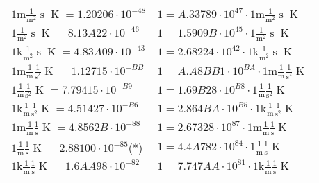 \begin{center}
\begin{longtable}{l l}
{\color{gray}$1 \bm{\mathrm{ m}}\frac1{\operatorname{m}^2}{\operatorname{s}}{}{\operatorname{K}} = 1.20206\cdot10^{-48} $}   & {\color{gray}$ 1 = A.33789\cdot10^{47} \cdot 1 \bm{\mathrm{ m}}\frac1{\operatorname{m}^2}{\operatorname{s}}{}{\operatorname{K}}$}  \\
{\color{black}$1 \bm{\mathrm{ }}\frac1{\operatorname{m}^2}{\operatorname{s}}{}{\operatorname{K}} = 8.13A22\cdot10^{-46} $}   & {\color{black}$ 1 = 1.5909B\cdot10^{45} \cdot 1 \bm{\mathrm{ }}\frac1{\operatorname{m}^2}{\operatorname{s}}{}{\operatorname{K}}$}  \\
{\color{gray}$1 \bm{\mathrm{ k}}\frac1{\operatorname{m}^2}{\operatorname{s}}{}{\operatorname{K}} = 4.83A09\cdot10^{-43} $}   & {\color{gray}$ 1 = 2.68224\cdot10^{42} \cdot 1 \bm{\mathrm{ k}}\frac1{\operatorname{m}^2}{\operatorname{s}}{}{\operatorname{K}}$}  \\
{\color{gray}$1 \bm{\mathrm{ m}}\frac1{\operatorname{m}}\frac1{\operatorname{s}^2}{}{\operatorname{K}} = 1.12715\cdot10^{-BB} $}   & {\color{gray}$ 1 = A.A8BB1\cdot10^{BA} \cdot 1 \bm{\mathrm{ m}}\frac1{\operatorname{m}}\frac1{\operatorname{s}^2}{}{\operatorname{K}}$}  \\
{\color{black}$1 \bm{\mathrm{ }}\frac1{\operatorname{m}}\frac1{\operatorname{s}^2}{}{\operatorname{K}} = 7.79415\cdot10^{-B9} $}   & {\color{black}$ 1 = 1.69B28\cdot10^{B8} \cdot 1 \bm{\mathrm{ }}\frac1{\operatorname{m}}\frac1{\operatorname{s}^2}{}{\operatorname{K}}$}  \\
{\color{gray}$1 \bm{\mathrm{ k}}\frac1{\operatorname{m}}\frac1{\operatorname{s}^2}{}{\operatorname{K}} = 4.51427\cdot10^{-B6} $}   & {\color{gray}$ 1 = 2.864BA\cdot10^{B5} \cdot 1 \bm{\mathrm{ k}}\frac1{\operatorname{m}}\frac1{\operatorname{s}^2}{}{\operatorname{K}}$}  \\
{\color{gray}$1 \bm{\mathrm{ m}}\frac1{\operatorname{m}}\frac1{\operatorname{s}}{}{\operatorname{K}} = 4.8562B\cdot10^{-88} $}   & {\color{gray}$ 1 = 2.67328\cdot10^{87} \cdot 1 \bm{\mathrm{ m}}\frac1{\operatorname{m}}\frac1{\operatorname{s}}{}{\operatorname{K}}$}  \\
{\color{black}$1 \bm{\mathrm{ }}\frac1{\operatorname{m}}\frac1{\operatorname{s}}{}{\operatorname{K}} = 2.88100\cdot10^{-85} $}\quad(*) & {\color{black}$ 1 = 4.4A782\cdot10^{84} \cdot 1 \bm{\mathrm{ }}\frac1{\operatorname{m}}\frac1{\operatorname{s}}{}{\operatorname{K}}$}  \\
{\color{gray}$1 \bm{\mathrm{ k}}\frac1{\operatorname{m}}\frac1{\operatorname{s}}{}{\operatorname{K}} = 1.6AA98\cdot10^{-82} $}   & {\color{gray}$ 1 = 7.747AA\cdot10^{81} \cdot 1 \bm{\mathrm{ k}}\frac1{\operatorname{m}}\frac1{\operatorname{s}}{}{\operatorname{K}}$}  \\

\end{longtable}
\end{center}
